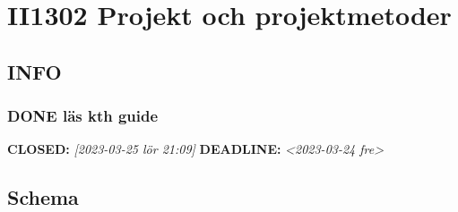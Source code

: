 \documentclass[11pt]{article}
\begin{document}
\section{II1302 Projekt och projektmetoder}
\label{sec:orgb91d5c9}
\subsection{INFO}
\label{sec:orgd7fc15f}
\subsubsection{{\bfseries\sffamily DONE} läs kth guide}
\label{sec:orgc990005}
\noindent\textbf{CLOSED:} \textit{[2023-03-25 lör 21:09] } \textbf{DEADLINE:} \textit{<2023-03-24 fre>}\\[0pt]

\subsection{Schema}
\label{sec:orgdd0c90d}
\end{document}
